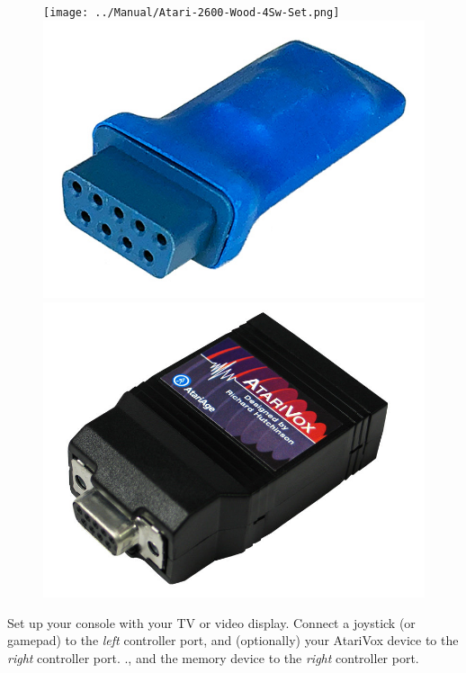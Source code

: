 \documentclass[10pt,twocolumn,openany,article]{memoir}
\begin{document}
\ifdefined\NOSAVE\else
\begin{figure}[b]
  \begin{center}
    \ifdefined\ATARIAGESAVE
    \texttt{[image: ../Manual/Atari-2600-Wood-4Sw-Set.png]}
    \else
    \includegraphics[width=\columnwidth]{../Manual/SaveKey.jpeg}
    \fi
    \includegraphics[width=\columnwidth]{../Manual/AtariVox.jpeg}
  \end{center}
\end{figure}
\fi

Set up  your console with your  TV or video display.  Connect a joystick
(or gamepad) to  the \emph{left} controller port\ifdefined\ATARIAGESAVE,
and  (optionally) your  AtariVox device  to the  \emph{right} controller
port.  \else\ifdefined\NOSAVE.\else{},  and  the memory  device  to  the
\emph{right} controller port.
\end{document}
